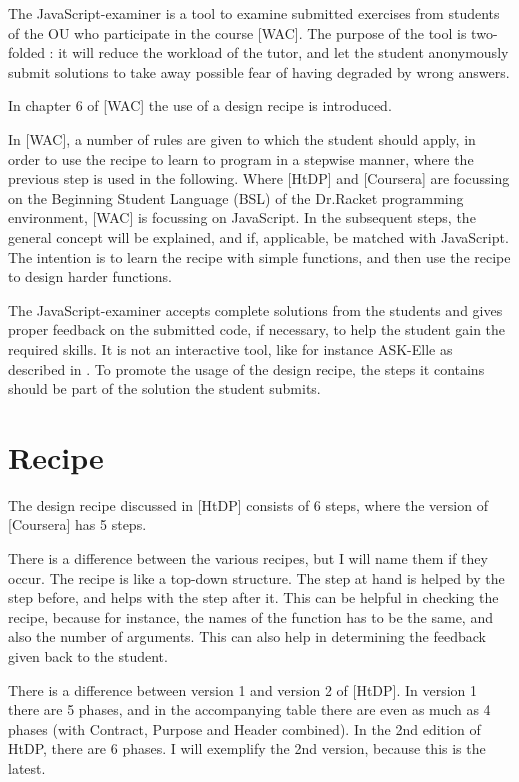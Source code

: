 The JavaScript-examiner is a tool to examine submitted exercises from students
of the OU who participate in the course [WAC].
The purpose of the tool is two-folded : it will  reduce the workload of the
tutor, and let the student anonymously submit solutions to take away possible
fear of having degraded by wrong answers.

In chapter 6 of [WAC] the use of a design recipe is introduced.

In [WAC], a number of rules are given to which the student should apply, in
order to use the recipe to learn to program in a stepwise manner, where the
previous step is used in the following.
Where [HtDP] and [Coursera] are focussing on the Beginning Student Language
(BSL) of the Dr.Racket programming environment, [WAC] is focussing on JavaScript.
In the subsequent steps, the general concept will be explained, and if,
applicable, be matched with JavaScript.
The intention is to learn the recipe with simple functions, and then use the
recipe to design harder functions.

The JavaScript-examiner accepts complete solutions from the students and gives proper
feedback on the submitted code, if necessary, to help the student gain the
required skills. It is not an interactive tool, like for instance ASK-Elle as
described in \citet{jeuring2012ask}.
To promote the usage of the design recipe, the steps it contains should be part
of the solution the student submits.


\section{Recipe}
The design recipe discussed in [HtDP] consists of 6 steps, where the version of
[Coursera] has 5 steps.

There is a difference between the various recipes, but I will name them if they occur.
The recipe is like a top-down structure. The step at hand is helped by the step
before, and helps with the step after it.
This can be helpful in checking the recipe, because for instance, the names of
the function has to be the same, and also the number of arguments.
This can also help in determining the feedback given back to the student.


There is a difference between version 1 and version 2 of [HtDP].
In version 1 there are 5 phases, and in the accompanying table there are even
as much as 4 phases (with Contract, Purpose and Header combined).
In the 2nd edition of HtDP, there are 6 phases.
I will exemplify the 2nd version, because this is the latest.

